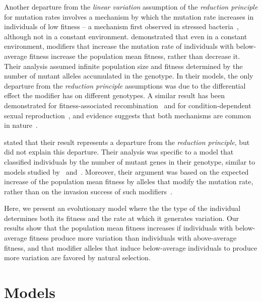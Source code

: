 \documentclass[9pt, a4paper, twocolumn]{extarticle}
\begin{document}
Another departure from the \emph{linear variation} assumption of the \emph{reduction principle} for mutation rates involves a mechanism by which the mutation rate increases in individuals of low fitness -- a mechanism first observed in stressed bacteria~\citep{Foster2007}, although not in a constant environment.
\citet{Ram2012} demonstrated that even in a constant environment, modifiers that increase the mutation rate of individuals with below-average fitness increase the population mean fitness, rather than decrease it.
Their analysis assumed  infinite population size and fitness  determined by the number of mutant alleles accumulated in the genotype.
In their models, the only departure from the \emph{reduction principle} assumptions was due to the differential effect the modifier has on different genotypes.
A similar result has been demonstrated for fitness-associated recombination~\citep{Hadany2003a} and for condition-dependent sexual reproduction~\citep{Hadany2007a}, and evidence suggests that both mechanisms are common in nature~\citep{Ram2016}.

\citet{Ram2012} stated that their result represents a departure from the \emph{reduction principle}, but did not explain this departure.
Their analysis was specific to a model that classified individuals by the number of mutant genes in their genotype, similar to models studied by~\citet{Kimura1966a} and~\citet{Haigh1978}.
Moreover, their argument was based on the expected increase of the population mean fitness by alleles that modify the mutation rate, rather than on the invasion success of such modifiers~\citep[i.e., analysis of \emph{evolutionary genetic stability}, see][]{Eshel1982, Lessard1990}.

Here, we present an evolutionary model where the the type of the individual determines both its fitness and the rate at which it generates variation.
Our results show that the population mean fitness increases if individuals with below-average fitness produce more variation than individuals with above-average fitness,
and that modifier alleles that induce below-average individuals to produce more variation are favored by natural selection.

\section*{Models}\label{sec:models}
\end{document}
